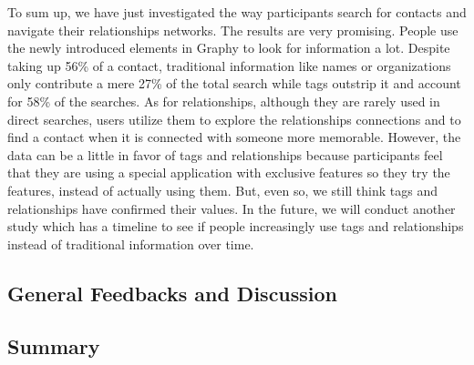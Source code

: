 To sum up, we have just investigated the way participants search for contacts and navigate their relationships networks. The results are very promising. People use the newly introduced elements in Graphy to look for information a lot. Despite taking up 56\% of a contact, traditional information like names or organizations only contribute a mere 27\% of the total search while tags outstrip it and account for 58\% of the searches. As for relationships, although they are rarely used in direct searches, users utilize them to explore the relationships connections and to find a contact when it is connected with someone more memorable. However, the data can be a little in favor of tags and relationships because participants feel that they are using a special application with exclusive features so they try the features, instead of actually using them. But, even so, we still think tags and relationships have confirmed their values. In the future, we will conduct another study which has a timeline to see if people increasingly use tags and relationships instead of traditional information over time.

\subsection{General Feedbacks and Discussion}\label{results_feedbacks}
\subsection{Summary}\label{results_summary}




